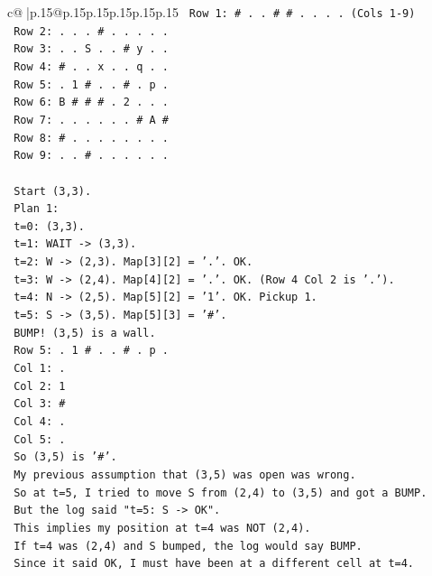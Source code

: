 \documentclass{article}
\begin{document}
{\begin{supertabular}{c@{$\;$}|p{.15\linewidth}@{}p{.15\linewidth}p{.15\linewidth}p{.15\linewidth}p{.15\linewidth}p{.15\linewidth}}
{{{\texttt{  Row 1: \# . . \# \# . . . . (Cols 1{-}9)} \\
\texttt{  Row 2: . . . \# . . . . .} \\
\texttt{  Row 3: . . S . . \# y . .} \\
\texttt{  Row 4: \# . . x . . q . .} \\
\texttt{  Row 5: . 1 \# . . \# . p .} \\
\texttt{  Row 6: B \# \# \# . 2 . . .} \\
\texttt{  Row 7: . . . . . . \# A \#} \\
\texttt{  Row 8: \# . . . . . . . .} \\
\texttt{  Row 9: . . \# . . . . . .} \\
\\ 
\texttt{  Start (3,3).} \\
\texttt{  Plan 1:} \\
\texttt{  t=0: (3,3).} \\
\texttt{  t=1: WAIT {-}> (3,3).} \\
\texttt{  t=2: W {-}> (2,3). Map{[}3{]}{[}2{]} = '.'. OK.} \\
\texttt{  t=3: W {-}> (2,4). Map{[}4{]}{[}2{]} = '.'. OK. (Row 4 Col 2 is '.').} \\
\texttt{  t=4: N {-}> (2,5). Map{[}5{]}{[}2{]} = '1'. OK. Pickup 1.} \\
\texttt{  t=5: S {-}> (3,5). Map{[}5{]}{[}3{]} = '\#'.} \\
\texttt{  BUMP! (3,5) is a wall.} \\
\texttt{  Row 5: . 1 \# . . \# . p .} \\
\texttt{  Col 1: .} \\
\texttt{  Col 2: 1} \\
\texttt{  Col 3: \#} \\
\texttt{  Col 4: .} \\
\texttt{  Col 5: .} \\
\texttt{  So (3,5) is '\#'.} \\
\texttt{  My previous assumption that (3,5) was open was wrong.} \\
\texttt{  So at t=5, I tried to move S from (2,4) to (3,5) and got a BUMP.} \\
\texttt{  But the log said "t=5: S {-}> OK".} \\
\texttt{  This implies my position at t=4 was NOT (2,4).} \\
\texttt{  If t=4 was (2,4) and S bumped, the log would say BUMP.} \\
\texttt{  Since it said OK, I must have been at a different cell at t=4.} \\
}}}
\end{supertabular}}
\end{document}
